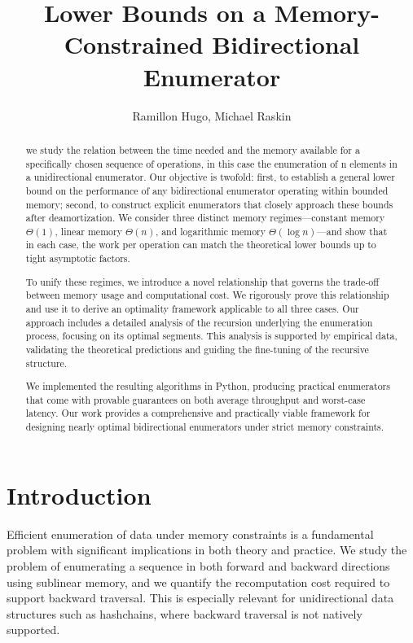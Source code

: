 \documentclass[a4paper,10pt]{article}
\begin{document}
    \title{Lower Bounds on a Memory-Constrained Bidirectional Enumerator}
    \author{Ramillon Hugo, Michael Raskin}
    \date{}
    \maketitle

    \tableofcontents

\space

       \begin{abstract} 
            we study the relation between the time needed and the memory available for a specifically chosen sequence of operations, in this case the enumeration of n elements in a unidirectional enumerator. Our objective is twofold: first, to establish a general lower bound on the performance of any bidirectional enumerator operating within bounded memory; second, to construct explicit enumerators that closely approach these bounds after deamortization. We consider three distinct memory regimes—constant memory $\Theta(1)$, linear memory $\Theta(n)$, and logarithmic memory $\Theta(\log n)$—and show that in each case, the work per operation can match the theoretical lower bounds up to tight asymptotic factors.

            To unify these regimes, we introduce a novel relationship that governs the trade-off between memory usage and computational cost. We rigorously prove this relationship and use it to derive an optimality framework applicable to all three cases. Our approach includes a detailed analysis of the recursion underlying the enumeration process, focusing on its optimal segments. This analysis is supported by empirical data, validating the theoretical predictions and guiding the fine-tuning of the recursive structure.

            We implemented the resulting algorithms in Python, producing practical enumerators that come with provable guarantees on both average throughput and worst-case latency. Our work provides a comprehensive and practically viable framework for designing nearly optimal bidirectional enumerators under strict memory constraints.
        \end{abstract}

        \newpage

        \section{Introduction}

Efficient enumeration of data under memory constraints is a fundamental problem with significant implications in both theory and practice. We study the problem of enumerating a sequence in both forward and backward directions using sublinear memory, and we quantify the recomputation cost required to support backward traversal. This is especially relevant for unidirectional data structures such as hashchains, where backward traversal is not natively supported.
\end{document}
